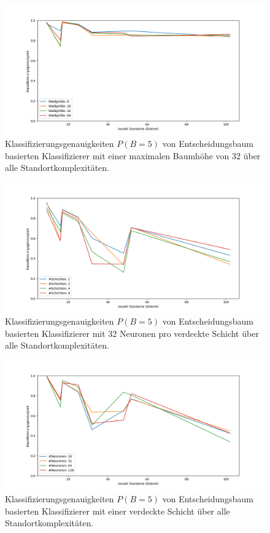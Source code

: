 \begin{figure}[h!]
    \centering
    \includegraphics[width=\linewidth]{images/multiple_best_by_group_dt_trees_acc_5_cont.png}
    \caption{Klassifizierungsgenauigkeiten $P(B=5)$ von Entscheidungsbaum basierten Klassifizierer mit einer maximalen Baumhöhe von 32 über alle Standortkomplexitäten.}
    \label{fig:multiple_best_by_group_dt_trees_acc_5_cont}
\end{figure}

\begin{figure}[h!]
    \centering
    \includegraphics[width=\linewidth]{images/multiple_best_by_group_knn_layers_acc_5_cont.png}
    \caption{Klassifizierungsgenauigkeiten $P(B=5)$ von Entscheidungsbaum basierten Klassifizierer mit 32 Neuronen pro verdeckte Schicht über alle Standortkomplexitäten.}
    \label{fig:multiple_best_by_group_knn_layers_acc_5_cont}
\end{figure}

\begin{figure}[h!]
    \centering
    \includegraphics[width=\linewidth]{images/multiple_best_by_group_knn_neurons_acc_10_cont.png}
    \caption{Klassifizierungsgenauigkeiten $P(B=5)$ von Entscheidungsbaum basierten Klassifizierer mit einer verdeckte Schicht über alle Standortkomplexitäten.}
    \label{fig:multiple_best_by_group_knn_neurons_acc_5_cont}
\end{figure}
